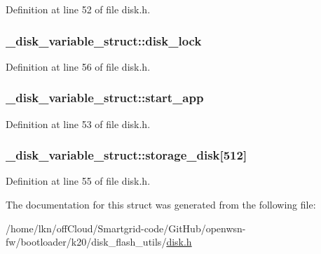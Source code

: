 Definition at line 52 of file disk.\+h.

\subsubsection[{\texorpdfstring{disk\+\_\+lock}{disk_lock}}]{ \+\_\+disk\+\_\+variable\+\_\+struct\+::disk\+\_\+lock}\hypertarget{struct__disk__variable__struct_a834d2c78b5aeb5a94fa2414628827861}{}\label{struct__disk__variable__struct_a834d2c78b5aeb5a94fa2414628827861}


Definition at line 56 of file disk.\+h.

\subsubsection[{\texorpdfstring{start\+\_\+app}{start_app}}]{ \+\_\+disk\+\_\+variable\+\_\+struct\+::start\+\_\+app}\hypertarget{struct__disk__variable__struct_a9ac73f96a2aa78c08e6607597f0bc6bf}{}\label{struct__disk__variable__struct_a9ac73f96a2aa78c08e6607597f0bc6bf}


Definition at line 53 of file disk.\+h.

\subsubsection[{\texorpdfstring{storage\+\_\+disk}{storage_disk}}]{ \+\_\+disk\+\_\+variable\+\_\+struct\+::storage\+\_\+disk\mbox{[}512\mbox{]}}\hypertarget{struct__disk__variable__struct_a69e1fce9adb96b4b608c53d85912d2d0}{}\label{struct__disk__variable__struct_a69e1fce9adb96b4b608c53d85912d2d0}


Definition at line 55 of file disk.\+h.



The documentation for this struct was generated from the following file\+:\begin{DoxyCompactItemize}
\item 
/home/lkn/off\+Cloud/\+Smartgrid-\/code/\+Git\+Hub/openwsn-\/fw/bootloader/k20/disk\+\_\+flash\+\_\+utils/\hyperlink{disk_8h}{disk.\+h}\end{DoxyCompactItemize}

